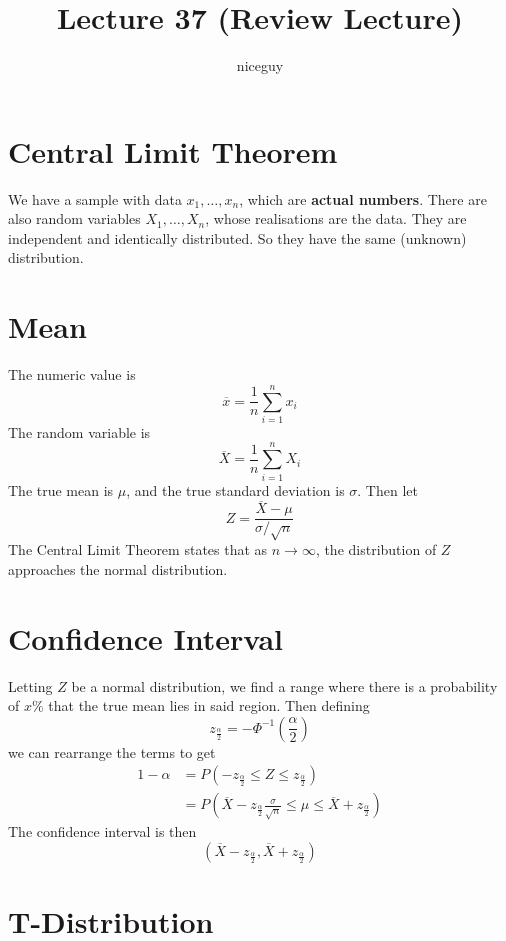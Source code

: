 \documentclass[12pt]{article}
\author{niceguy}
\title{Lecture 37 (Review Lecture)}
\begin{document}
\maketitle

\section{Central Limit Theorem}

We have a sample with data $x_1,\dots,x_n$, which are \textbf{actual numbers}. There are also random variables $X_1,\dots,X_n$, whose realisations are the data. They are independent and identically distributed. So they have the same (unknown) distribution.

\section{Mean}

The numeric value is
$$\overline x = \frac{1}{n} \sum_{i=1}^n x_i$$
The random variable is
$$\overline X = \frac{1}{n} \sum_{i=1}^n X_i$$
The true mean is $\mu$, and the true standard deviation is $\sigma$. Then let
$$Z = \frac{\overline X - \mu}{\sigma/\sqrt{n}}$$
The Central Limit Theorem states that as $n\rightarrow\infty$, the distribution of $Z$ approaches the normal distribution.

\section{Confidence Interval}

Letting $Z$ be a normal distribution, we find a range where there is a probability of $x\%$ that the true mean lies in said region. Then defining
$$z_{\frac{\alpha}{2}} = -\Phi^{-1}\left(\frac{\alpha}{2}\right)$$
we can rearrange the terms to get
\begin{align*}
    1 - \alpha &= P\left(-z_{\frac{\alpha}{2}} \leq Z \leq z_{\frac{\alpha}{2}}\right) \\
               &= P\left(\overline X - z_{\frac{\alpha}{2}} \frac{\sigma}{\sqrt{n}} \leq \mu \leq \overline X + z_{\frac{\alpha}{2}}\right)
\end{align*}
The confidence interval is then
$$\left(\overline X - z_{\frac{\alpha}{2}}, \overline X + z_{\frac{\alpha}{2}}\right)$$

\section{T-Distribution}
\end{document}
